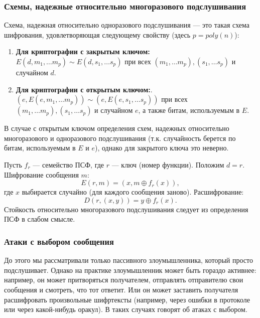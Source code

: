 \subsubsection{Схемы, надежные относительно многоразового подслушивания}

\begin{definition}
    Схема, надежная относительно одноразового подслушивания --- это такая схема шифрования, удовлетворяющая следующему свойству (здесь \(p = poly(n)\)):
    \begin{enumerate}
        \item \textbf{Для криптографии с закрытым ключом:} \(E(d, m_1, \dots m_p) \sim E(d, s_1, \dots s_p)\) при всех \((m_1, \dots m_p), (s_1, \dots s_p)\) и случайном \(d\). 
        \item \textbf{Для криптографии с открытым ключом:}. \((e, E(e, m_1, \dots m_p)) \sim (e, E(e, s_1, \dots s_p))\) при всех \((m_1, \dots m_p), (s_1, \dots s_p)\) и случайном \(e\), а также битам, используемым в \(E\).
    \end{enumerate}
\end{definition}

\begin{note}
    В случае с открытым ключом определения схем, надежных относительно многоразового и одноразового подслушивания (т.к. случайность берется по битам, используемым в \(E\) и \(e\)), однако для закрытого ключа это неверно.
\end{note}

\begin{example}
    Пусть \(f_r\) --- семейство ПСФ, где \(r\) --- ключ (номер функции). Положим \(d = r\).  
    Шифрование сообщения \(m\):
    \[
        E(r, m) = (x, m \oplus f_r(x)),
    \]
    где \(x\) выбирается случайно (для каждого сообщения заново).  
    Расшифрование:
    \[
        D(r, (x, y)) = y \oplus f_r(x).
    \]
    Стойкость относительно многоразового подслушивания следует из определения ПСФ в слабом смысле.
\end{example}

\subsubsection{Атаки с выбором сообщения}

До этого мы рассматривали только пассивного злоумышленника, который просто подслушивает. Однако на практике злоумышленник может быть гораздо активнее: например, он может притворяться получателем, отправлять отправителю свои сообщения и смотреть, что тот ответит. Или он может заставить получателя расшифровать произвольные шифртексты (например, через ошибки в протоколе или через какой-нибудь оракул). В таких случаях говорят об атаках с выбором.

